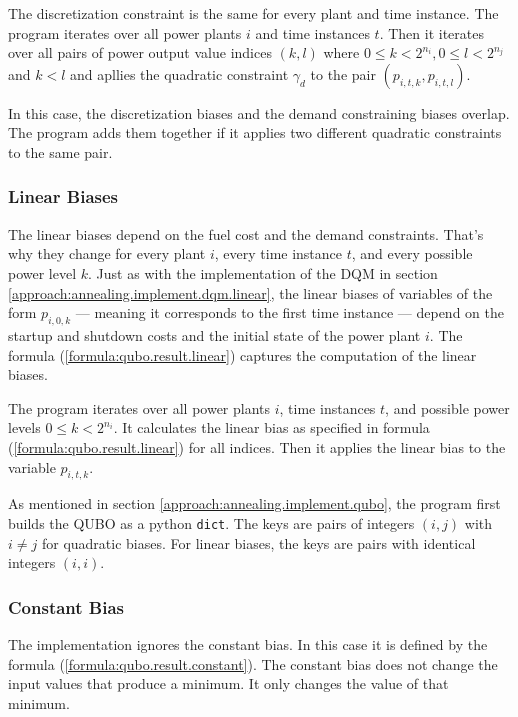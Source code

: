 The discretization constraint is the same for every plant and time instance.
The program iterates over all power plants $i$ and time instances $t$.
Then it iterates over all pairs of power output value indices $(k, l)$ where $0 \leq k < 2^{n_i}, 0 \leq l < 2^{n_j}$ and $k < l$ and apllies the quadratic constraint $\gamma_d$ to the pair $(p_{i, t, k}, p_{i, t, l})$.

In this case, the discretization biases and the demand constraining biases overlap.
The program adds them together if it applies two different quadratic constraints to the same pair.

\subsubsection{Linear Biases}

The linear biases depend on the fuel cost and the demand constraints.
That's why they change for every plant $i$, every time instance $t$, and every possible power level $k$.
Just as with the implementation of the DQM in section \ref{approach:annealing.implement.dqm.linear}, the linear biases of variables of the form $p_{i, 0, k}$
--- meaning it corresponds to the first time instance ---
depend on the startup and shutdown costs and the initial state of the power plant $i$.
The formula (\ref{formula:qubo.result.linear}) captures the computation of the linear biases.

The program iterates over all power plants $i$, time instances $t$, and possible power levels $0 \leq k < 2^{n_i}$.
It calculates the linear bias as specified in formula (\ref{formula:qubo.result.linear}) for all indices.
Then it applies the linear bias to the variable $p_{i, t, k}$.

As mentioned in section \ref{approach:annealing.implement.qubo}, the program first builds the QUBO as a python \texttt{dict}.
The keys are pairs of integers $(i, j)$ with $i \neq j$ for quadratic biases.
For linear biases, the keys are pairs with identical integers $(i, i)$.

\subsubsection{Constant Bias}

The implementation ignores the constant bias.
In this case it is defined by the formula (\ref{formula:qubo.result.constant}).
The constant bias does not change the input values that produce a minimum.
It only changes the value of that minimum.
